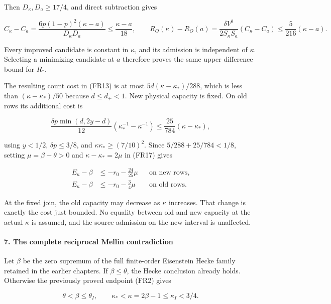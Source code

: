 Then \(D_\kappa,D_a\ge17/4\), and direct subtraction gives

\[
C_\kappa-C_a
=\frac{6p(1-p)^2(\kappa-a)}{D_\kappa D_a}
\le\frac{\kappa-a}{18},\qquad
R_O(\kappa)-R_O(a)
=\frac{\delta V^2}{2S_\kappa S_a}(C_\kappa-C_a)
\le\frac5{216}(\kappa-a).
\tag{FR23}
\]

Every improved candidate is constant in \(\kappa\), and its admission is independent of \(\kappa\). Selecting a minimizing candidate at \(a\) therefore proves the same upper difference bound for \(R_*\).

The resulting count cost in (FR13) is at most \(5d(\kappa-\kappa_*)/288\), which is less than \((\kappa-\kappa_*)/50\) because \(d\le d_+<1\). New physical capacity is fixed. On old rows its additional cost is

\[
\frac{\delta p\min(d,2y-d)}{12}
 (\kappa_*^{-1}-\kappa^{-1})
\le\frac{25}{784}(\kappa-\kappa_*),
\]

using \(y<1/2\), \(\delta p\le3/8\), and \(\kappa\kappa_*\ge(7/10)^2\). Since \(5/288+25/784<1/8\), setting \(\mu=\beta-\theta>0\) and \(\kappa-\kappa_*=2\mu\) in (FR17) gives

\[
\begin{aligned}
E_\kappa-\beta&\le-r_0-\frac{24}{25}\mu
 &&\text{on new rows},\\
E_\kappa-\beta&\le-r_0-\frac34\mu
 &&\text{on old rows}.
\end{aligned}
\tag{FR24}
\]

At the fixed join, the old capacity may decrease as \(\kappa\) increases. That change is exactly the cost just bounded. No equality between old and new capacity at the actual \(\kappa\) is assumed, and the source admission on the new interval is unaffected.

\hypertarget{first-return:the-complete-reciprocal-mellin-contradiction}{%
\paragraph{7. The complete reciprocal Mellin contradiction}\label{first-return:the-complete-reciprocal-mellin-contradiction}}

Let \(\beta\) be the zero supremum of the full finite-order Eisenstein Hecke family retained in the earlier chapters. If \(\beta\le\theta\), the Hecke conclusion already holds. Otherwise the previously proved endpoint (FR2) gives

\[
\theta<\beta\le\theta_I,\qquad
\kappa_*<\kappa=2\beta-1\le\kappa_I<3/4.
\tag{FR25}
\]

